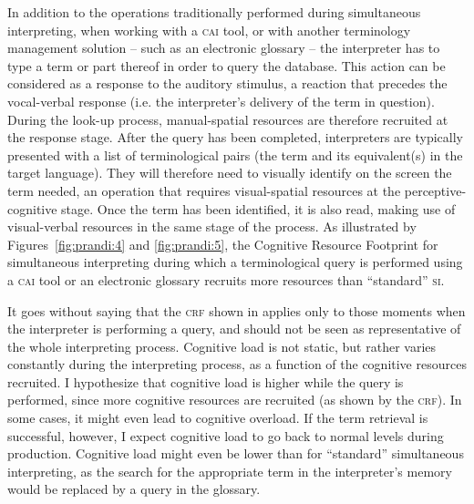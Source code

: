 \documentclass[output=paper]{langsci/langscibook}
\begin{document}
In addition to the operations traditionally performed during simultaneous interpreting, when working with a \textsc{cai} tool, or with another terminology management solution -- such as an electronic glossary -- the interpreter has to type a term or part thereof in order to query the database. This action can be considered as a response to the auditory stimulus, a reaction that precedes the vocal-verbal response (i.e. the interpreter’s delivery of the term in question). During the look-up process, manual-spatial resources are therefore recruited at the response stage. After the query has been completed, interpreters are typically presented with a list of terminological pairs (the term and its equivalent(s) in the target language). They will therefore need to visually identify on the screen the term needed, an operation that requires visual-spatial resources at the perceptive-cognitive stage. Once the term has been identified, it is also read, making use of visual-verbal resources in the same stage of the process. As illustrated by Figures~\ref{fig:prandi:4} and \ref{fig:prandi:5}, the Cognitive Resource Footprint for simultaneous interpreting during which a terminological query is performed using a \textsc{cai} tool or an electronic glossary recruits more resources than ``standard'' \textsc{si}. 

It goes without saying that the \textsc{crf} shown in  applies only to those moments when the interpreter is performing a query, and should not be seen as representative of the whole interpreting process. Cognitive load is not static, but rather varies constantly during the interpreting process, as a function of the cognitive resources recruited. I hypothesize that cognitive load is higher while the query is performed, since more cognitive resources are recruited (as shown by the \textsc{crf}). In some cases, it might even lead to cognitive overload. If the term retrieval is successful, however, I expect cognitive load to go back to normal levels during production. Cognitive load might even be lower than for ``standard'' simultaneous interpreting, as the search for the appropriate term in the interpreter’s memory would be replaced by a query in the glossary.
\end{document}
